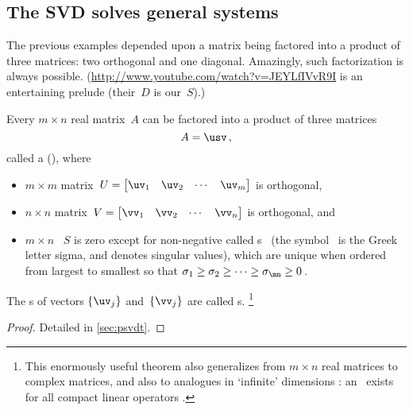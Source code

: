 \subsection{The SVD solves general systems}
\label{sec:svdsgs}


The previous examples depended upon a matrix being factored into a product of three matrices: 
two orthogonal and one diagonal.
Amazingly, such factorization is always possible.
(\url{http://www.youtube.com/watch?v=JEYLfIVvR9I} is an entertaining prelude (their~\(D\) is our~\(S\)).)

\begin{theorem} \label{thm:svd} 
    Every $m\times n$ real matrix~$A$ can be factored into a product of three matrices
    \begin{equation}
        A=\usv\,,
    \end{equation}
    called a  (\svd), where
    \begin{itemize}
		\item $m\times m$ matrix~$U=\begin{bmatrix} \uv _1 &\uv_2&\cdots&\uv _m \end{bmatrix}$ is orthogonal, 
		\item $n\times n$ matrix~$V=\begin{bmatrix} \vv_1 &\vv_2&\cdots&\vv_n \end{bmatrix}$ is orthogonal, and      
        \item  $m\times n$ ~$S$ is zero except 
		for non-negative  called s \hlist\sigma\mn\ (the symbol~\bfidx{$\sigma$} is the Greek letter sigma, and denotes singular values), which are unique when ordered from largest to smallest so that $\sigma_1\geq \sigma_2 \geq \cdots \geq \sigma_{\mn}\geq 0$\,.
    \end{itemize}
    The s of vectors \(\{\uv_j\}\) and~\(\{\vv_j\}\) are called s.%
    \footnote{This enormously useful theorem also generalizes from \(m\times n\) real matrices to complex matrices, and also to analogues in `infinite' dimensions  \cite[\S5]{Stewart1993}: an \svd\ exists for all compact linear operators \cite[\S7]{Kress2015}.}
\end{theorem}

\begin{proof}
Detailed in \cref{sec:psvdt}.
\end{proof}

